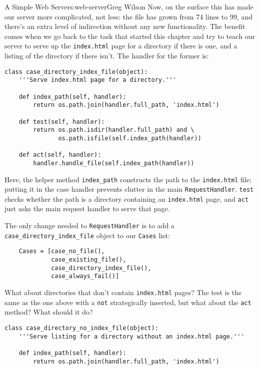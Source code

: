 \begin{aosachapter}{A Simple Web Server}{s:web-server}{Greg Wilson}
Now, on the surface this has made our server more complicated, not less:
the file has grown from 74 lines to 99, and there's an extra level of
indirection without any new functionality. The benefit comes when we go
back to the task that started this chapter and try to teach our server
to serve up the \texttt{index.html} page for a directory if there is
one, and a listing of the directory if there isn't. The handler for the
former is:

\begin{verbatim}
class case_directory_index_file(object):
    '''Serve index.html page for a directory.'''

    def index_path(self, handler):
        return os.path.join(handler.full_path, 'index.html')

    def test(self, handler):
        return os.path.isdir(handler.full_path) and \
               os.path.isfile(self.index_path(handler))

    def act(self, handler):
        handler.handle_file(self.index_path(handler))
\end{verbatim}

Here, the helper method \texttt{index\_path} constructs the path to the
\texttt{index.html} file; putting it in the case handler prevents
clutter in the main \texttt{RequestHandler}. \texttt{test} checks
whether the path is a directory containing an \texttt{index.html} page,
and \texttt{act} just asks the main request handler to serve that page.

The only change needed to \texttt{RequestHandler} is to add a
\texttt{case\_directory\_index\_file} object to our \texttt{Cases} list:

\begin{verbatim}
    Cases = [case_no_file(),
             case_existing_file(),
             case_directory_index_file(),
             case_always_fail()]
\end{verbatim}

What about directories that don't contain \texttt{index.html} pages? The
test is the same as the one above with a \texttt{not} strategically
inserted, but what about the \texttt{act} method? What should it do?

\begin{verbatim}
class case_directory_no_index_file(object):
    '''Serve listing for a directory without an index.html page.'''

    def index_path(self, handler):
        return os.path.join(handler.full_path, 'index.html')


\end{verbatim}
\end{aosachapter}
